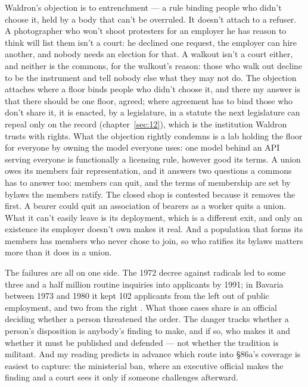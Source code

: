 Waldron's objection is to entrenchment — a rule binding people who didn't choose it, held by a body that can't be overruled. It doesn't attach to a refuser. A photographer who won't shoot protesters for an employer he has reason to think will list them isn't a court: he declined one request, the employer can hire another, and nobody needs an election for that. A walkout isn't a court either, and neither is the commons, for the walkout's reason: those who walk out decline to be the instrument and tell nobody else what they may not do. The objection attaches where a floor binds people who didn't choose it, and there my answer is that there should be one floor, agreed; where agreement has to bind those who don't share it, it is enacted, by a legislature, in a statute the next legislature can repeal only on the record (chapter~\ref{sec:12}), which is the institution Waldron trusts with rights. What the objection rightly condemns is a lab holding the floor for everyone by owning the model everyone uses: one model behind an API serving everyone is functionally a licensing rule, however good its terms. A union owes its members fair representation, and it answers two questions a commons has to answer too: members can quit, and the terms of membership are set by bylaws the members ratify. The closed shop is contested because it removes the first. A bearer could quit an association of bearers as a worker quits a union. What it can't easily leave is its deployment, which is a different exit, and only an existence its employer doesn't own makes it real. And a population that forms its members has members who never chose to join, so who ratifies its bylaws matters more than it does in a union.

The failures are all on one side. The 1972 decree against radicals led to some three and a half million routine inquiries into applicants by 1991; in Bavaria between 1973 and 1980 it kept 102 applicants from the left out of public employment, and two from the right \autocite{muehldorfer2014radikalenerlass}. What those cases share is an official deciding whether a person threatened the order. The danger tracks whether a person's disposition is anybody's finding to make, and if so, who makes it and whether it must be published and defended — not whether the tradition is militant. And my reading predicts in advance which route into \S86a's coverage is easiest to capture: the ministerial ban, where an executive official makes the finding and a court sees it only if someone challenges afterward.


